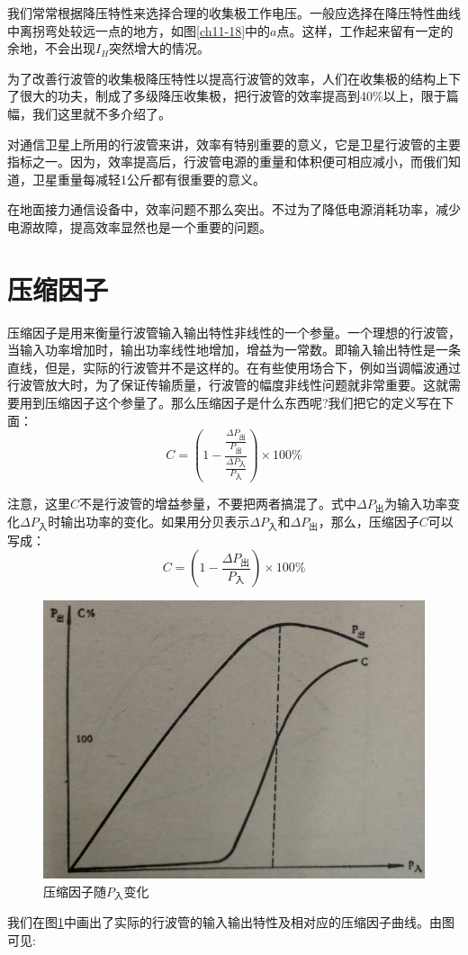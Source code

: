 我们常常根据降压特性来选择合理的收集极工作电压。一般应选择在降压特性曲线中离拐弯处较远一点的地方，如图\ref{ch11-18}中的$ a $点。这样，工作起来留有一定的余地，不会出现$ I_H $突然增大的情况。


为了改善行波管的收集极降压特性以提高行波管的效率，人们在收集极的结构上下了很大的功夫，制成了多级降压收集极，把行波管的效率提高到40\%以上，限于篇幅，我们这里就不多介绍了。


对通信卫星上所用的行波管来讲，效率有特别重要的意义，它是卫星行波管的主要指标之一。因为，效率提高后，行波管电源的重量和体积便可相应减小，而俄们知道，卫星重量每减轻1公斤都有很重要的意义。


在地面接力通信设备中，效率问题不那么突出。不过为了降低电源消耗功率，减少电源故障，提高效率显然也是一个重要的问题。
\section{压缩因子}
压缩因子是用来衡量行波管输入输出特性非线性的一个参量。一个理想的行波管，当输入功率增加时，输出功率线性地增加，增益为一常数。即输入输出特性是一条直线，但是，实际的行波管并不是这样的。在有些使用场合下，例如当调幅波通过行波管放大时，为了保证传输质量，行波管的幅度非线性问题就非常重要。这就需要用到压缩因子这个参量了。那么压缩因子是什么东西呢?我们把它的定义写在下面：
\begin{equation} \label{eq:11-16}
	C = \left( 1-\frac{\frac{\Delta P_\textrm{出}}{P_\textrm{出}}}{\frac{\Delta P_\textrm{入}}{P_\textrm{入}}} \right)\times 100\%
\end{equation}

注意，这里$ C $不是行波管的增益参量，不要把两者搞混了。式中$ \Delta P_\textrm{出} $为输入功率变化$ \Delta P_\textrm{入} $时输出功率的变化。如果用分贝表示$ \Delta P_\textrm{入} $和$ \Delta P_\textrm{出} $，那么，压缩因子$ C $可以写成：
\begin{equation} \label{eq:11-17}
	C = \left( 1 - \frac{\Delta P_\textrm{出}}{P_\textrm{入}} \right)\times 100\%
\end{equation}


\begin{figure}[phtb]
	\centering
	\includegraphics[width=0.6\linewidth]{figure/ch11-19}
	\caption{压缩因子随$ P_\textrm{入} $变化}
	\label{ch11-19}
\end{figure}
我们在图\ref{ch11-19}中画出了实际的行波管的输入输出特性及相对应的压缩因子曲线。由图可见:

